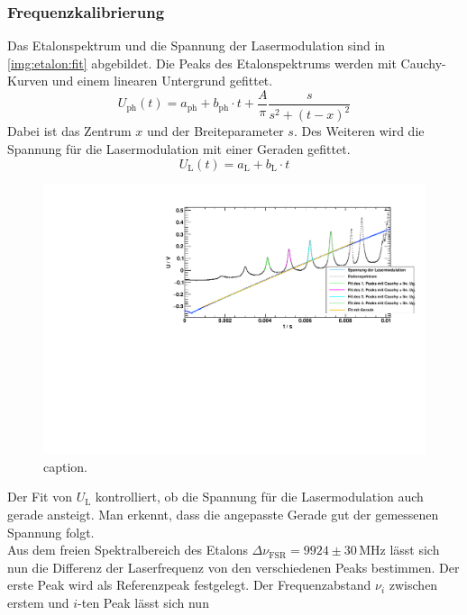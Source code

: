 \subsubsection*{Frequenzkalibrierung}
Das Etalonspektrum und die Spannung der Lasermodulation sind in \autoref{img:etalon:fit} abgebildet. 
Die Peaks des Etalonspektrums werden mit Cauchy-Kurven und einem linearen Untergrund gefittet. 
\begin{equation}
    U_\text{ph}(t) = a_\text{ph} + b_\text{ph} \cdot t + \frac{A}{\pi} \frac{s}{s^2 + (t-x)^2}
\end{equation}
Dabei ist das Zentrum $x$ und der Breiteparameter $s$.
Des Weiteren wird die Spannung für die Lasermodulation mit einer Geraden gefittet.
\begin{equation}
    U_\text{L}(t) = a_\text{L} + b_\text{L} \cdot t
\end{equation}
\begin{figure}[H]
\begin{center}
  \includegraphics[width=\textwidth]{../img/part2/up-etalon_zoom_fit.pdf}
  \caption{caption.}
  \label{img:etalon:fit}
\end{center}
\end{figure}
Der Fit von $U_\text{L}$ kontrolliert, ob die Spannung für die Lasermodulation auch gerade ansteigt. Man erkennt, dass die angepasste Gerade 
gut der gemessenen Spannung folgt.\\
Aus dem freien Spektralbereich des Etalons $\Delta \nu_\text{FSR} = 9924 \pm 30\,\text{MHz}$ lässt sich nun die Differenz der Laserfrequenz von den verschiedenen 
Peaks bestimmen. Der erste Peak wird als Referenzpeak festgelegt. Der Frequenzabstand $\nu_i$ zwischen erstem und $i$-ten Peak lässt sich nun 

